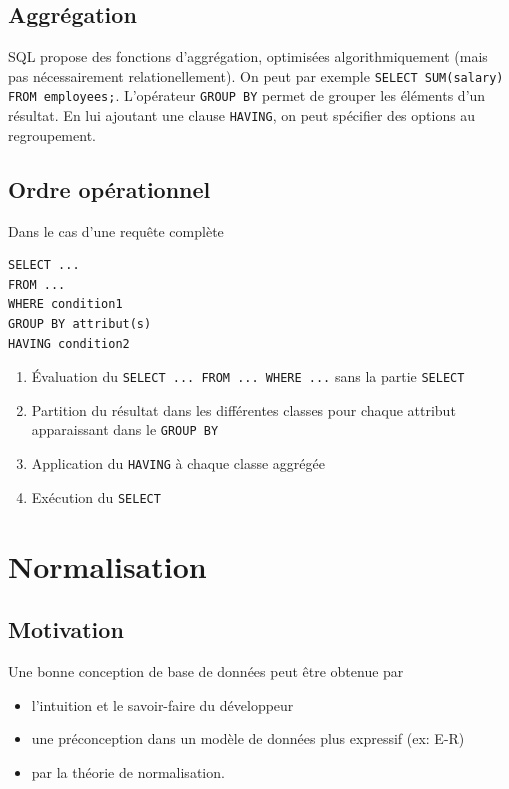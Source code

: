 \documentclass[a4paper]{article}
\begin{document}
\subsection{Aggrégation}
SQL propose des fonctions d'aggrégation, optimisées algorithmiquement (mais pas
nécessairement relationellement). On peut par exemple \texttt{SELECT SUM(salary) FROM employees;}.
L'opérateur \texttt{GROUP BY} permet de grouper les éléments d'un résultat. En lui ajoutant une
clause \texttt{HAVING}, on peut spécifier des options au regroupement.

\subsection{Ordre opérationnel}
Dans le cas d'une requête complète
\begin{lstlisting}
SELECT ...
FROM ...
WHERE condition1
GROUP BY attribut(s)
HAVING condition2
\end{lstlisting}

\begin{enumerate}
  \item \'Evaluation du \texttt{SELECT ... FROM ... WHERE ...} sans la partie
        \texttt{SELECT}
  \item Partition du résultat dans les différentes classes pour chaque attribut
        apparaissant dans le \texttt{GROUP BY}
  \item Application du \texttt{HAVING} à chaque classe aggrégée
  \item Exécution du \texttt{SELECT}
\end{enumerate}


\section{Normalisation}
\subsection{Motivation}
Une bonne conception de base de données peut être obtenue par
\begin{itemize}
  \item l'intuition et le savoir-faire du développeur
  \item une préconception dans un modèle de données plus expressif (ex: E-R)
  \item par la théorie de normalisation.
\end{itemize}
\end{document}
